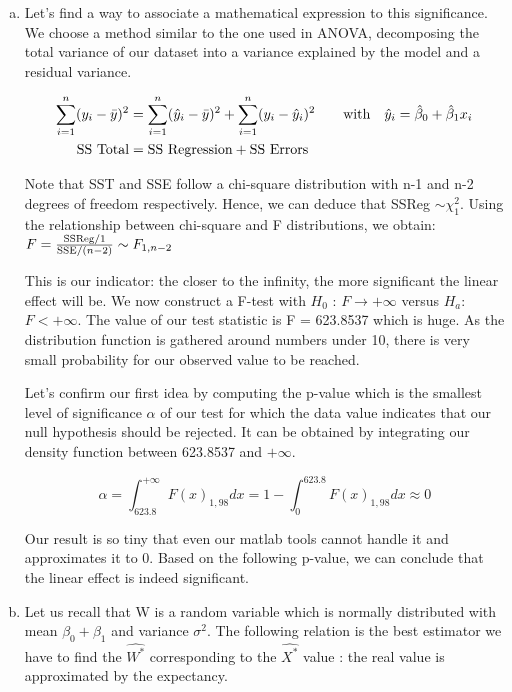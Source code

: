 \documentclass[a4paper]{article}
\begin{document}
\begin{enumerate}[(a)]
\item Let's find a way to associate a mathematical expression to this significance. We choose a method similar to the one used in ANOVA, decomposing the total variance of our dataset into a variance explained by the model and a residual variance. 

\nonumber
\begin{equation} \label{eq1}
\begin{split}
\sum_{i=1}^n(y_i-\bar{y})^2 & = \sum_{i=1}^n(\hat{y}_i-\bar{y})^2 + \sum_{i=1}^n(y_i-\hat{y}_i)^2 \qquad \textup{with} \quad \hat{y}_i = \hat{\beta}_0 + \hat{\beta}_1 x_i \\
 \textup{SS Total} & = \textup{SS Regression} + \textup{SS Errors}
\end{split}
\end{equation}

Note that SST and SSE follow a chi-square distribution with n-1 and n-2 degrees of freedom respectively. Hence, we can deduce that SSReg $\sim \chi_1^2$. Using the relationship between chi-square and F distributions, we obtain: $F = \frac{\textup{SSReg}/1}{\textup{SSE}/(n-2)} \sim F_{1,n-2}$ 

This is our indicator: the closer to the infinity, the more significant  the linear effect will be. 
We now construct a F-test with $H_0$ : $F\rightarrow + \infty $ versus $H_a$: $F< +\infty$. The value of our test statistic is F = 623.8537 which is huge. As the distribution function is gathered around numbers under 10, there is very small probability for our observed value to be reached.

Let's confirm our first idea by computing the p-value which is the smallest level of significance $\alpha$ of our test for which the data value indicates that our null hypothesis should be rejected. It can be obtained by integrating our density function between 623.8537 and $+\infty$.

$$\alpha = \int_{623.8}^{+\infty} F(x)_{1,98} dx  = 1- \int_0^{623.8} F(x)_{1,98} dx \approx 0$$

Our result is so tiny that even our matlab tools cannot handle it and approximates it to 0. Based on the following p-value, we can conclude that the linear effect is indeed significant.

\item Let us recall that W is a random variable which is normally distributed with mean $\beta_0 + \beta_1$ and variance $\sigma^2$. The following relation is the best estimator we have to find the $\hat{W^*}$ corresponding to the $\hat{X^*}$ value : the real value is approximated by the expectancy.


\end{enumerate}
\end{document}
